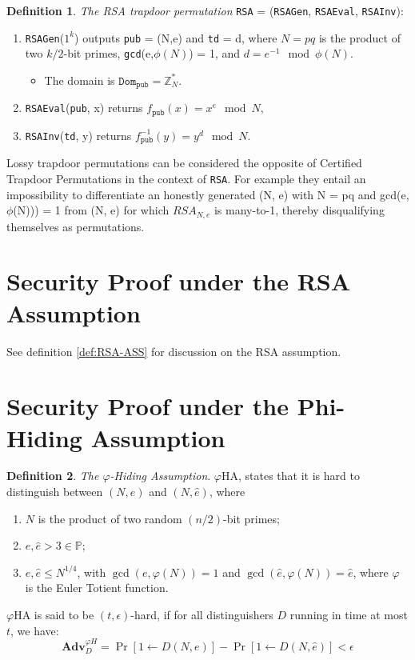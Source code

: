 \documentclass[]{final_report}
\theoremstyle{definition}
\newtheorem{definition}{Definition}[chapter]
\begin{document}
\begin{definition} 
\textit{The RSA trapdoor permutation} \texttt{RSA} = (\texttt{RSAGen}, \texttt{RSAEval}, \texttt{RSAInv}): 
\begin{enumerate}
\item \texttt{RSAGen}($1^k$) outputs \texttt{pub} = (N,e) and \texttt{td} = d, where $N = pq$ is the product of two $k/2$-bit primes, \texttt{gcd}(e,$\phi(N)$) = 1, and $d = e^{-1} \mod \phi(N)$. 
\begin{itemize}
\item The domain is $\texttt{Dom}_{\texttt{pub}} = \mathbb{Z}_N^*$. 
\end{itemize}
\item \texttt{RSAEval}(\texttt{pub}, x) returns $f_{\texttt{pub}}(x) = x^e \mod N$, 
\item \texttt{RSAInv}(\texttt{td}, y) returns $f_{\texttt{pub}}^{-1}(y) = y^d \mod N$. 
\end{enumerate}

\end{definition} 

Lossy trapdoor permutations can be considered the opposite of Certified Trapdoor Permutations in the context of \texttt{RSA}. For example they entail an impossibility to differentiate an honestly generated (N, e) with N = pq and gcd(e, $\phi$(N))) = 1 from (N, e) for which $RSA_{N, e}$ is many-to-1, thereby disqualifying themselves as permutations.


\section{Security Proof under the RSA Assumption}
See definition \ref{def:RSA-ASS} for discussion on the RSA assumption.






\section{Security Proof under the Phi-Hiding Assumption}

\begin{definition}
\textit{The $\varphi$-Hiding Assumption}. $\varphi$HA, states that it is hard to distinguish between $(N,e)$ and $(N,\hat{e})$, where 
\begin{enumerate}
\item $N$ is the product of two random $(n/2)$-bit primes;
\item $e, \hat{e} > 3 \in \mathbb{P}$;
\item $e, \hat{e} \leq N^{1/4}$, with $\gcd(e, \varphi(N)) = 1$ and $\gcd(\hat{e}, \varphi(N)) = \hat{e}$, where $\varphi$ is the Euler Totient function. 
\end{enumerate}
$\varphi$HA is said to be $(t, \epsilon)$-hard, if for all distinguishers $D$ running in time at most $t$, we have:
\[
\textbf{Adv}^{\varphi H}_D = \Pr[1 \leftarrow D(N, e)] - \Pr[1 \leftarrow D(N, \hat{e})] < \epsilon
\]
\end{definition}






\newpage

\printbibliography
\label{endpage}
\end{document}
